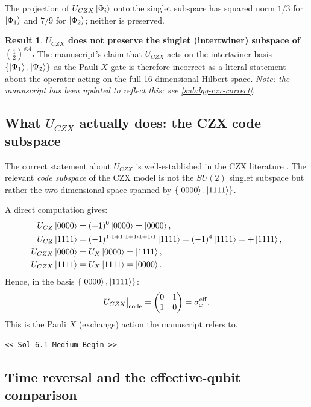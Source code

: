 \documentclass[11pt,a4paper]{article}
\theoremstyle{definition}
\newtheorem{result}{Result}
\newcommand{\GPTBegin}{\par\noindent\textcolor{GPTMarker}{\texttt{\textless\textless{} Sol 6.1 Medium Begin \textgreater\textgreater}}\par}
\begin{document}
The projection of $U_{CZX}\ket{\Phi_i}$ onto the singlet subspace has squared
norm $1/3$ for $\ket{\Phi_1}$ and $7/9$ for $\ket{\Phi_2}$; neither is
preserved.

\begin{result}\label{res:UCZX-does-not-preserve}
  \textbf{$U_{CZX}$ does not preserve the singlet (intertwiner) subspace
  of $(\tfrac{1}{2})^{\otimes 4}$.}
  The manuscript's claim that $U_{CZX}$ acts on the intertwiner basis
  $\{\ket{\Psi_1},\ket{\Psi_2}\}$ as the Pauli $X$ gate is therefore
  incorrect as a literal statement about the operator acting on the
  full 16-dimensional Hilbert space.
  \emph{Note: the manuscript has been updated to reflect this; see \autoref{sub:lqg-czx-correct}}.
\end{result}

\subsection{What $U_{CZX}$ actually does: the CZX code subspace}
\label{sub:CZX-code}

The correct statement about $U_{CZX}$ is well-established in the CZX
literature \cite{Chen2010Local}.  The relevant \emph{code subspace} of the
CZX model is not the $SU(2)$ singlet subspace but rather the two-dimensional
space spanned by $\{\ket{0000},\ket{1111}\}$.

A direct computation gives:
\begin{align}
  U_{CZ}\ket{0000} &= (+1)^0\ket{0000} = \ket{0000},\\
  U_{CZ}\ket{1111} &= (-1)^{1\cdot1+1\cdot1+1\cdot1+1\cdot1}\ket{1111}
                   = (-1)^4\ket{1111} = +\ket{1111},\\
  U_{CZX}\ket{0000} &= U_X\ket{0000} = \ket{1111},\\
  U_{CZX}\ket{1111} &= U_X\ket{1111} = \ket{0000}.
\end{align}
Hence, in the basis $\{\ket{0000},\ket{1111}\}$:
\begin{equation}\label{eqn:UCZX-code-matrix}
  U_{CZX}\big|_{\rm code} = \begin{pmatrix}0&1\\1&0\end{pmatrix} = \sigma_x^{\rm eff}.
\end{equation}
This is the Pauli $X$ (exchange) action the manuscript refers to.

\GPTBegin{}

\subsection{Time reversal and the effective-qubit comparison}
\label{sub:TR-singlets}\label{sub:lqg-czx-correct}
\label{sub:corrections-calc2}
\end{document}
